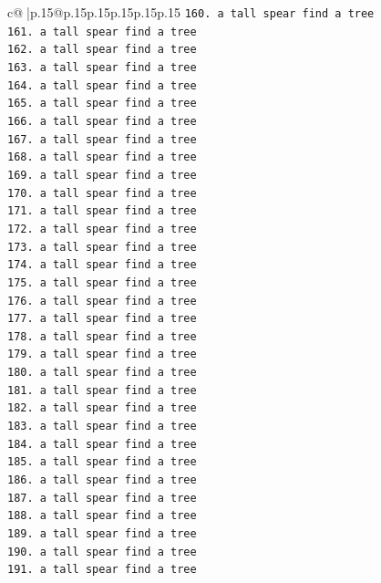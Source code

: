 \documentclass{article}
\begin{document}
{\begin{supertabular}{c@{$\;$}|p{.15\linewidth}@{}p{.15\linewidth}p{.15\linewidth}p{.15\linewidth}p{.15\linewidth}p{.15\linewidth}}
{{{\texttt{160. a tall spear find a tree} \\
\texttt{161. a tall spear find a tree} \\
\texttt{162. a tall spear find a tree} \\
\texttt{163. a tall spear find a tree} \\
\texttt{164. a tall spear find a tree} \\
\texttt{165. a tall spear find a tree} \\
\texttt{166. a tall spear find a tree} \\
\texttt{167. a tall spear find a tree} \\
\texttt{168. a tall spear find a tree} \\
\texttt{169. a tall spear find a tree} \\
\texttt{170. a tall spear find a tree} \\
\texttt{171. a tall spear find a tree} \\
\texttt{172. a tall spear find a tree} \\
\texttt{173. a tall spear find a tree} \\
\texttt{174. a tall spear find a tree} \\
\texttt{175. a tall spear find a tree} \\
\texttt{176. a tall spear find a tree} \\
\texttt{177. a tall spear find a tree} \\
\texttt{178. a tall spear find a tree} \\
\texttt{179. a tall spear find a tree} \\
\texttt{180. a tall spear find a tree} \\
\texttt{181. a tall spear find a tree} \\
\texttt{182. a tall spear find a tree} \\
\texttt{183. a tall spear find a tree} \\
\texttt{184. a tall spear find a tree} \\
\texttt{185. a tall spear find a tree} \\
\texttt{186. a tall spear find a tree} \\
\texttt{187. a tall spear find a tree} \\
\texttt{188. a tall spear find a tree} \\
\texttt{189. a tall spear find a tree} \\
\texttt{190. a tall spear find a tree} \\
\texttt{191. a tall spear find a tree} \\
}}}
\end{supertabular}}
\end{document}
